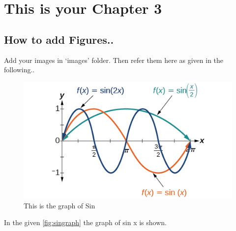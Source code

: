 \chapter{This is your Chapter 3}

\blindtext 


\section{How to add Figures..}
Add your images in `images' folder. Then refer them here as given in the following..

\begin{figure}[htb!]
	\centering
	\caption{This is the graph of Sin}
	\label{fig:singraph}
	\includegraphics[scale=0.8]{images/sin}
\end{figure}


In the given  \autoref{fig:singraph} the graph of sin x is shown.